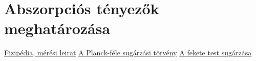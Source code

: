 \documentclass[a4paper, 12pt]{article}
\begin{document}
    \section{Abszorpciós tényezők meghatározása}

    \begin{thebibliography}

         \href{https://fizipedia.bme.hu/index.php/H%C5%91m%C3%A9rs%C3%A9kleti_sug%C3%A1rz%C3%A1s_vizsg%C3%A1lata}{Fizipédia, mérési leirat}
         \href{https://en.wikipedia.org/wiki/Planck%27s_law}{A Planck-féle sugárzási törvény}
         \href{https://glossary.periodni.com/glossary.php?en=blackbody+radiation}{A fekete test sugárzása}
    \end{thebibliography}
\end{document}
